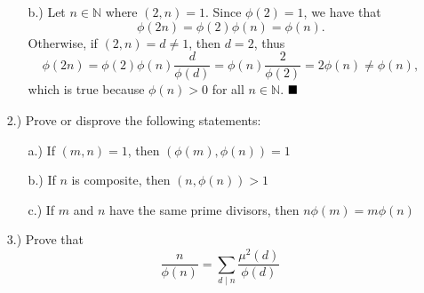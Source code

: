 \documentclass[12pt]{article}
\newcommand{\N}{\mathbb{N}}
\newcommand{\done}{\ensuremath{
    \strut\hfill\blacksquare
}}
\begin{document}
\begin{itemize}
\begin{itemize}
            \item [b.)] Let \( n \in \N \) where \( (2, n) = 1 \).
            Since \( \phi(2) = 1 \), we have that
            \[
                \phi(2n)
                = \phi(2)\phi(n)
                = \phi(n)
                .
            \]
            Otherwise, if \( (2, n) = d \ne 1 \), then \( d = 2 \), thus
            \[
                \phi(2n)
                = \phi(2)\phi(n)\frac{d}{\phi(d)}
                = \phi(n)\frac{2}{\phi(2)}
                = 2\phi(n)
                \ne \phi(n)
                ,
            \]
            which is true because \( \phi(n) > 0 \) for all \( n \in \N \).
            \done

        \end{itemize}

        \item [2.)] Prove or disprove the following statements:
        \begin{itemize}
            \item [a.)] If \( (m, n) = 1 \), then
            \( (\phi(m), \phi(n)) = 1 \)

            \item [b.)] If \( n \) is composite, then \( (n, \phi(n)) > 1 \)
            
            \item [c.)] If \( m \) and \( n \) have the same prime divisors,
            then \( n\phi(m) = m\phi(n) \)
        \end{itemize}

        \item [3.)] Prove that
        \[
            \frac{n}{\phi(n)}
            = \sum_{d \mid n} \frac{\mu^2(d)}{\phi(d)}
        \]
    \end{itemize}
\end{document}
